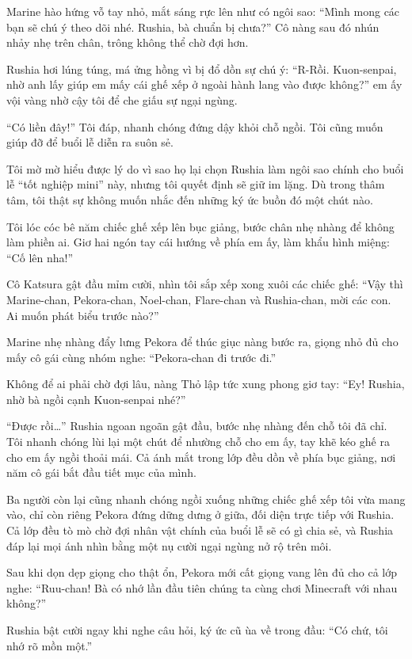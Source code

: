 \documentclass[../main.tex]{subfiles}
\begin{document}
Marine hào hứng vỗ tay nhỏ, mắt sáng rực lên như có ngôi sao: ``Mình mong các bạn sẽ chú ý theo dõi nhé. Rushia, bà chuẩn bị chưa?'' Cô nàng sau đó nhún nhảy nhẹ trên chân, trông không thể chờ đợi hơn.

Rushia hơi lúng túng, má ửng hồng vì bị đổ dồn sự chú ý: ``R-Rồi. Kuon-senpai, nhờ anh lấy giúp em mấy cái ghế xếp ở ngoài hành lang vào được không?'' em ấy vội vàng nhờ cậy tôi để che giấu sự ngại ngùng.

``Có liền đây!'' Tôi đáp, nhanh chóng đứng dậy khỏi chỗ ngồi. Tôi cũng muốn giúp đỡ để buổi lễ diễn ra suôn sẻ.

Tôi mờ mờ hiểu được lý do vì sao họ lại chọn Rushia làm ngôi sao chính cho buổi lễ ``tốt nghiệp mini'' này, nhưng tôi quyết định sẽ giữ im lặng. Dù trong thâm tâm, tôi thật sự không muốn nhắc đến những ký ức buồn đó một chút nào.

Tôi lóc cóc bê năm chiếc ghế xếp lên bục giảng, bước chân nhẹ nhàng để không làm phiền ai. Giơ hai ngón tay cái hướng về phía em ấy, làm khẩu hình miệng: ``Cố lên nha!''

Cô Katsura gật đầu mỉm cười, nhìn tôi sắp xếp xong xuôi các chiếc ghế: ``Vậy thì Marine-chan, Pekora-chan, Noel-chan, Flare-chan và Rushia-chan, mời các con. Ai muốn phát biểu trước nào?''

Marine nhẹ nhàng đẩy lưng Pekora để thúc giục nàng bước ra, giọng nhỏ đủ cho mấy cô gái cùng nhóm nghe: ``Pekora-chan đi trước đi.''

Không để ai phải chờ đợi lâu, nàng Thỏ lập tức xung phong giơ tay: ``Ey! Rushia, nhờ bà ngồi cạnh Kuon-senpai nhé?''

``Được rồi\dots'' Rushia ngoan ngoãn gật đầu, bước nhẹ nhàng đến chỗ tôi đã chỉ. Tôi nhanh chóng lùi lại một chút để nhường chỗ cho em ấy, tay khẽ kéo ghế ra cho em ấy ngồi thoải mái. Cả ánh mắt trong lớp đều dồn về phía bục giảng, nơi năm cô gái bắt đầu tiết mục của mình.

Ba người còn lại cũng nhanh chóng ngồi xuống những chiếc ghế xếp tôi vừa mang vào, chỉ còn riêng Pekora đứng dững dưng ở giữa, đối diện trực tiếp với Rushia. Cả lớp đều tò mò chờ đợi nhân vật chính của buổi lễ sẽ có gì chia sẻ, và Rushia đáp lại mọi ánh nhìn bằng một nụ cười ngại ngùng nở rộ trên môi.

Sau khi dọn dẹp giọng cho thật ổn, Pekora mới cất giọng vang lên đủ cho cả lớp nghe: ``Ruu-chan! Bà có nhớ lần đầu tiên chúng ta cùng chơi Minecraft với nhau không?''

Rushia bật cười ngay khi nghe câu hỏi, ký ức cũ ùa về trong đầu: ``Có chứ, tôi nhớ rõ mồn một.''
\end{document}
